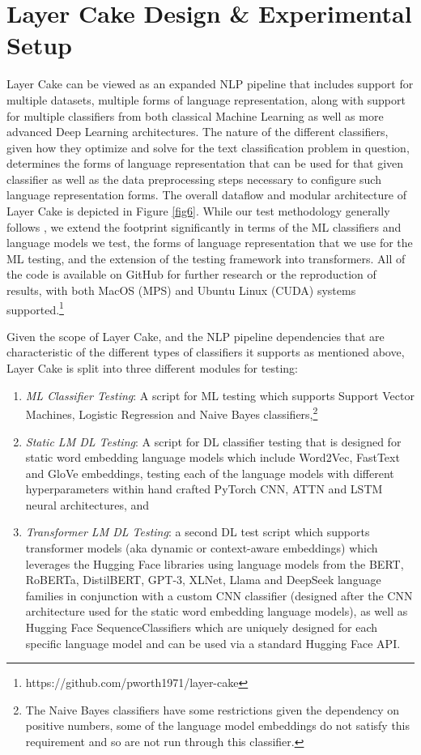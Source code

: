\documentclass[final]{clv2025-revised}
\begin{document}
\section{Layer Cake Design \& Experimental Setup}

Layer Cake can be viewed as an expanded NLP pipeline that includes support for multiple datasets, multiple forms of language representation, along with support for multiple classifiers from both classical Machine Learning as well as more advanced Deep Learning architectures. The nature of the different classifiers, given how they optimize and solve for the text classification problem in question, determines the forms of language representation that can be used for that given classifier as well as the data preprocessing steps necessary to configure such language representation forms. The overall dataflow and modular architecture of Layer Cake is depicted in Figure \ref{fig6}. While our test methodology generally follows \cite{moreo2021}, we extend the footprint significantly in terms of the ML classifiers and language models we test, the forms of language representation that we use for the ML testing, and the extension of the testing framework into transformers. All of the code is available on GitHub for further research or the reproduction of results, with both MacOS (MPS) and Ubuntu Linux (CUDA) systems supported.\footnote{https://github.com/pworth1971/layer-cake}

Given the scope of Layer Cake, and the NLP pipeline dependencies that are characteristic of the different types of classifiers it supports as mentioned above, Layer Cake is split into three different modules for testing:
\begin{enumerate}
    \item \textit{ML Classifier Testing}: A script for ML testing which supports Support Vector Machines, Logistic Regression and Naive Bayes classifiers,\footnote{The Naive Bayes classifiers have some restrictions given the dependency on positive numbers, some of the language model embeddings do not satisfy this requirement and so are not run through this classifier.}
    \item \textit{Static LM DL Testing}: A script for DL classifier testing that is designed for static word embedding language models which include Word2Vec, FastText and GloVe embeddings, testing each of the language models with different hyperparameters within hand crafted PyTorch CNN, ATTN and LSTM neural architectures, and
    \item \textit{Transformer LM DL Testing}: a second DL test script which supports transformer models (aka dynamic or context-aware embeddings) which leverages the Hugging Face libraries using language models from the BERT, RoBERTa, DistilBERT, GPT-3, XLNet, Llama and DeepSeek language families in conjunction with a custom CNN classifier (designed after the CNN architecture used for the static word embedding language models), as well as Hugging Face SequenceClassifiers which are uniquely designed for each specific language model and can be used via a standard Hugging Face API.
\end{enumerate}
\end{document}
